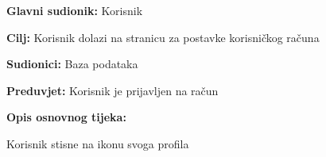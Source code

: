 					\noindent {}
					\begin{packed_item}
						\item \textbf{Glavni sudionik:} Korisnik
						\item \textbf{Cilj:} Korisnik dolazi na stranicu za postavke korisničkog računa
						\item \textbf{Sudionici:} Baza podataka
						\item \textbf{Preduvjet:} Korisnik je prijavljen na račun
						\item \textbf{Opis osnovnog tijeka:}
						\begin{packed_enum}
							\item Korisnik stisne na ikonu svoga profila
						\end{packed_enum}
					\end{packed_item}


